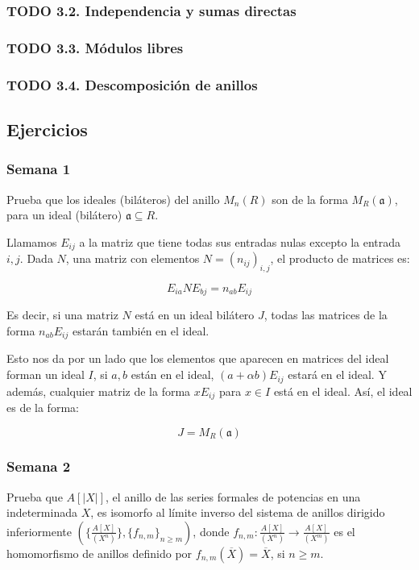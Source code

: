 \documentclass[11pt]{article}
\begin{document}
\subsubsection*{{\bfseries\sffamily TODO} 3.2. Independencia y sumas directas}
\label{sec-7-3-2}
\subsubsection*{{\bfseries\sffamily TODO} 3.3. Módulos libres}
\label{sec-7-3-3}
\subsubsection*{{\bfseries\sffamily TODO} 3.4. Descomposición de anillos}
\label{sec-7-3-4}
\subsection*{Ejercicios}
\label{sec-7-4}
\subsubsection*{Semana 1}
\label{sec-7-4-1}
\begin{statement}
Prueba que los ideales (biláteros) del anillo $M_n(R)$ son de la forma
$M_R(\mathfrak{a})$, para un ideal (bilátero) $\mathfrak{a} \subseteq R$.
\end{statement}

Llamamos $E_{ij}$ a la matriz que tiene todas sus entradas nulas excepto
la entrada $i,j$. Dada $N$, una matriz con elementos $N = (n_{ij})_{i,j}$, el
producto de matrices es:

\[
E_{ia}NE_{bj} = n_{ab}E_{ij}
\]

Es decir, si una matriz $N$ está en un ideal bilátero $J$, todas las 
matrices de la forma $n_{ab}E_{ij}$ estarán también en el ideal.

Esto nos da por un lado que los elementos que aparecen en matrices 
del ideal forman un ideal $I$, si $a,b$ están en el ideal, $(a+\alpha b)E_{ij}$ 
estará en el ideal. Y además, cualquier matriz de la forma $xE_{ij}$ para
$x \in I$ está en el ideal. Así, el ideal es de la forma:

\[
J = M_R(\mathfrak{a})
\]

\subsubsection*{Semana 2}
\label{sec-7-4-2}
\begin{statement}
Prueba que $A[|X|]$, el anillo de las series formales de potencias en una
indeterminada $X$, es isomorfo al límite inverso del sistema de anillos
dirigido inferiormente $(\{\frac{A[X]}{(X^n)}\}, \{f_{n,m}\}_{n \geq m})$, donde $f_{n,m} : \frac{A[X]}{(X^n)} \to \frac{A[X]}{(X^m)}$ es
el homomorfismo de anillos definido por $f_{n,m}(\overline{X}) = \overline{X}$, si $n \geq m$.
\end{statement}
\end{document}

